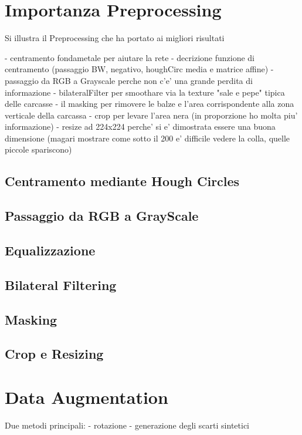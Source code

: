 \section{Importanza Preprocessing}

Si illustra il Preprocessing che ha portato ai migliori risultati

- centramento fondametale per aiutare la rete
    - decrizione funzione di centramento (passaggio BW, negativo, houghCirc media e matrice affine)
- passaggio da RGB a Grayscale perche non c'e' una grande perdita di informazione
- bilateralFilter per smoothare via la texture "sale e pepe" tipica delle carcasse
- il masking per rimovere le balze e l'area corrispondente alla zona verticale della carcassa
- crop per levare l'area nera (in proporzione ho molta piu' informazione)
- resize ad 224x224 perche' si e' dimostrata essere una buona dimensione (magari mostrare come sotto il 200 e' difficile vedere la colla, quelle piccole spariscono)

\subsection {Centramento mediante Hough Circles}
\subsection {Passaggio da RGB a GrayScale}
\subsection {Equalizzazione}
\subsection {Bilateral Filtering}
\subsection {Masking}
\subsection {Crop e Resizing}







\section {Data Augmentation}
Due metodi principali:
 - rotazione
 - generazione degli scarti sintetici

